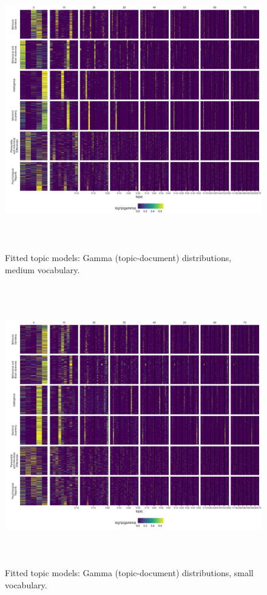 \documentclass[12pt]{article}
\begin{document}
\begin{figure}
\centering
\includegraphics[width=6in,height=4.8in]{img/05_md_gamma.png}
\caption{Fitted topic models: Gamma (topic-document) distributions, medium vocabulary. \label{fig:gamma-md}}
\end{figure}

\begin{figure}
\centering
\includegraphics[width=6in,height=4.8in]{img/05_sm_gamma.png}
\caption{Fitted topic models: Gamma (topic-document) distributions, small vocabulary. \label{fig:gamma-sm}}
\end{figure}
\end{document}
